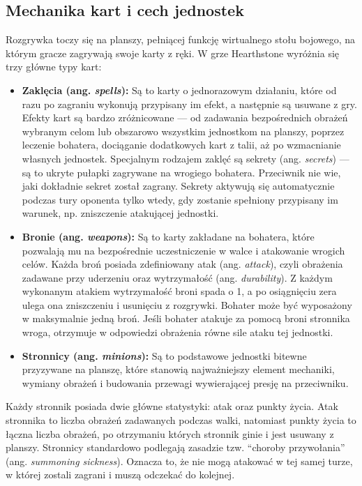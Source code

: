 \subsection{Mechanika kart i cech jednostek} \label{sec:mechanika_kart}
Rozgrywka toczy się na planszy, pełniącej funkcję wirtualnego stołu bojowego, na którym gracze zagrywają swoje karty z ręki. W grze Hearthstone wyróżnia się trzy główne typy kart:

\begin{itemize}
\item \textbf{Zaklęcia (ang. \textit{spells}):} Są to karty o jednorazowym działaniu, które od razu po zagraniu wykonują przypisany im efekt, a następnie są usuwane z gry. Efekty kart są bardzo zróżnicowane --- od zadawania bezpośrednich obrażeń wybranym celom lub obszarowo wszystkim jednostkom na planszy, poprzez leczenie bohatera, dociąganie dodatkowych kart z talii, aż po wzmacnianie własnych jednostek. Specjalnym rodzajem zaklęć są sekrety (ang. \textit{secrets}) --- są to ukryte pułapki zagrywane na wrogiego bohatera. Przeciwnik nie wie, jaki dokładnie sekret został zagrany. Sekrety aktywują się automatycznie podczas tury oponenta tylko wtedy, gdy zostanie spełniony przypisany im warunek, np. zniszczenie atakującej jednostki.
\item \textbf{Bronie (ang. \textit{weapons}):} Są to karty zakładane na bohatera, które pozwalają mu na bezpośrednie uczestniczenie w walce i atakowanie wrogich celów. Każda broń posiada zdefiniowany atak (ang. \textit{attack}), czyli obrażenia zadawane przy uderzeniu oraz wytrzymałość (ang. \textit{durability}). Z każdym wykonanym atakiem wytrzymałość broni spada o 1, a po osiągnięciu zera ulega ona zniszczeniu i usunięciu z rozgrywki. Bohater może być wyposażony w maksymalnie jedną broń. Jeśli bohater atakuje za pomocą broni stronnika wroga, otrzymuje w odpowiedzi obrażenia równe sile ataku tej jednostki.
\item \textbf{Stronnicy (ang. \textit{minions}):} Są to podstawowe jednostki bitewne przyzywane na planszę, które stanowią najważniejszy element mechaniki, wymiany obrażeń i budowania przewagi wywierającej presję na przeciwniku.
\end{itemize}

Każdy stronnik posiada dwie główne statystyki: atak oraz punkty życia. Atak stronnika to liczba obrażeń zadawanych podczas walki, natomiast punkty życia to łączna liczba obrażeń, po otrzymaniu których stronnik ginie i jest usuwany z planszy. Stronnicy standardowo podlegają zasadzie tzw. \enquote{choroby przywołania} (ang. \textit{summoning sickness}). Oznacza to, że nie mogą atakować w tej samej turze, w której zostali zagrani i muszą odczekać do kolejnej.

